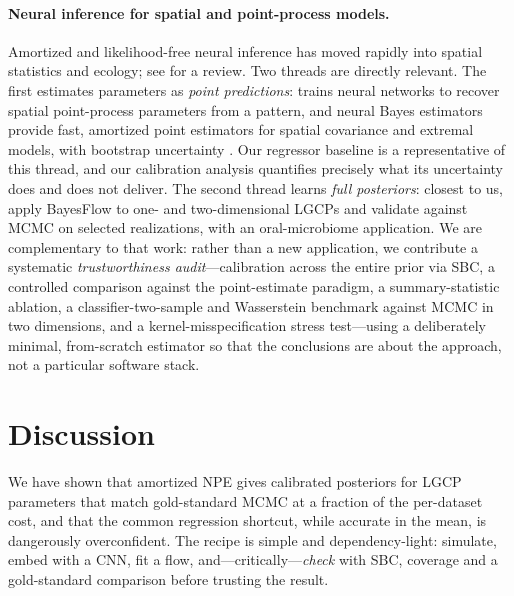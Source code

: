 \documentclass[11pt]{article}
\begin{document}
\paragraph{Neural inference for spatial and point-process models.}
Amortized and likelihood-free neural inference has moved rapidly into spatial
statistics and ecology; see \citet{zammitmangion2025neural} for a review. Two
threads are directly relevant. The first estimates parameters as \emph{point
predictions}: \citet{vihrs2022using} trains neural networks to recover
spatial point-process parameters from a pattern, and neural Bayes estimators
provide fast, amortized point estimators for spatial covariance and extremal
models, with bootstrap uncertainty
\citep{gerber2021fast,lenzi2023neural,sainsbury2024likelihood,sainsbury2023neural}.
Our regressor baseline is a representative of this thread, and our calibration
analysis quantifies precisely what its uncertainty does and does not deliver. The
second thread learns \emph{full posteriors}: closest to us,
\citet{wang2025inference} apply BayesFlow \citep{radev2020bayesflow} to one- and
two-dimensional LGCPs and validate against MCMC on selected realizations, with an
oral-microbiome application. We are complementary to that work: rather than a new
application, we contribute a systematic \emph{trustworthiness audit}---calibration
across the entire prior via SBC, a controlled comparison against the
point-estimate paradigm, a summary-statistic ablation, a classifier-two-sample
and Wasserstein benchmark against MCMC in two dimensions, and a
kernel-misspecification stress
test---using a deliberately minimal, from-scratch estimator so that the
conclusions are about the approach, not a particular software stack.

\section{Discussion}

We have shown that amortized NPE gives calibrated posteriors for LGCP parameters
that match gold-standard MCMC at a fraction of the per-dataset cost, and that the
common regression shortcut, while accurate in the mean, is dangerously
overconfident. The recipe is simple and dependency-light: simulate, embed with a
CNN, fit a flow, and---critically---\emph{check} with SBC, coverage and a
gold-standard comparison before trusting the result.
\end{document}
